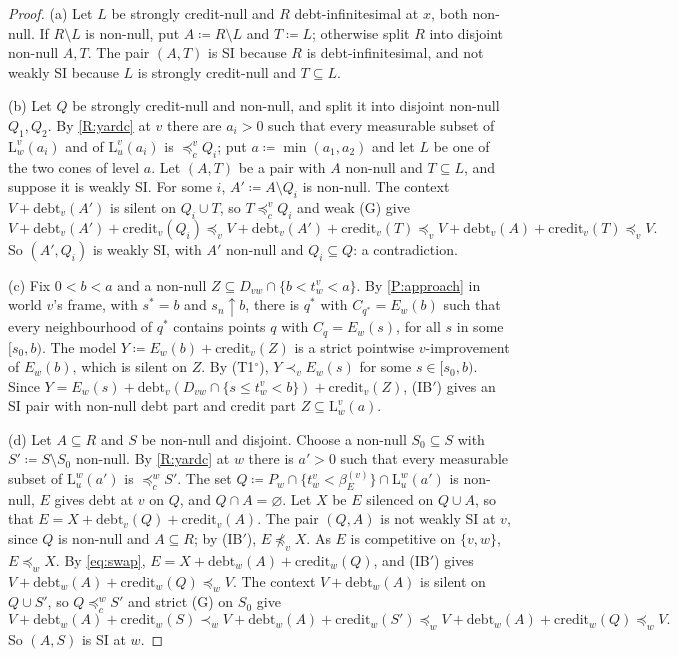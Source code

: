 \documentclass[11pt]{article}
\theoremstyle{definition}\newtheorem{definition}[theorem]{Definition}
\theoremstyle{remark}\newtheorem{remark}[theorem]{Remark}
\newcommand{\debt}{\mathrm{debt}}
\newcommand{\cred}{\mathrm{credit}}
\newcommand{\Lo}[3]{\mathrm L^{#1}_{#2}(#3)}
\newcommand{\To}{\textup{(T1$^\circ$)}}
\begin{document}
\begin{proof}
(a) Let $L$ be strongly credit-null and $R$ debt-infinitesimal at $x$, both
non-null. If $R\setminus L$ is non-null, put $A\coloneqq R\setminus L$ and
$T\coloneqq L$; otherwise split $R$ into disjoint non-null $A,T$. The pair
$(A,T)$ is SI because $R$ is debt-infinitesimal, and not weakly SI because
$L$ is strongly credit-null and $T\subseteq L$.

(b) Let $Q$ be strongly credit-null and non-null, and split it into
disjoint non-null $Q_1,Q_2$. By \ref{R:yardc} at $v$ there are $a_i>0$ such
that every measurable subset of $\Lo vw{a_i}$ and of $\Lo vu{a_i}$ is
$\preceq^v_cQ_i$; put $a\coloneqq\min(a_1,a_2)$ and let $L$ be one of the two
cones of level $a$. Let $(A,T)$ be a pair with $A$ non-null and $T\subseteq
L$, and suppose it is weakly SI. For some $i$, $A'\coloneqq A\setminus Q_i$
is non-null. The context $V+\debt_v(A')$ is silent on $Q_i\cup T$, so
$T\preceq^v_cQ_i$ and weak (G) give
\[
 V+\debt_v(A')+\cred_v(Q_i)\preceq_vV+\debt_v(A')+\cred_v(T)\preceq_v
 V+\debt_v(A)+\cred_v(T)\preceq_vV.
\]
So $(A',Q_i)$ is weakly SI, with $A'$ non-null and $Q_i\subseteq Q$: a
contradiction.

(c) Fix $0<b<a$ and a non-null $Z\subseteq D_{vw}\cap\{b<t^v_w<a\}$. By
\ref{P:approach} in world $v$'s frame, with $s^*=b$ and $s_n\uparrow b$,
there is $q^*$ with $C_{q^*}=E_w(b)$ such that every neighbourhood of $q^*$
contains points $q$ with $C_q=E_w(s)$, for all $s$ in some $[s_0,b)$. The
model $Y\coloneqq E_w(b)+\cred_v(Z)$ is a strict pointwise $v$-improvement of
$E_w(b)$, which is silent on $Z$. By \To{}, $Y\prec_vE_w(s)$ for some
$s\in[s_0,b)$. Since
$Y=E_w(s)+\debt_v(D_{vw}\cap\{s\le t^v_w<b\})+\cred_v(Z)$, (IB$'$) gives an
SI pair with non-null debt part and credit part $Z\subseteq\Lo vwa$.

(d) Let $A\subseteq R$ and $S$ be non-null and disjoint. Choose a non-null
$S_0\subseteq S$ with $S'\coloneqq S\setminus S_0$ non-null. By
\ref{R:yardc} at $w$ there is $a'>0$ such that every measurable subset of
$\Lo wu{a'}$ is $\preceq^w_cS'$. The set $Q\coloneqq P_w\cap
\{t^v_w<\beta^{(v)}_E\}\cap\Lo wu{a'}$ is non-null, $E$ gives debt at $v$ on
$Q$, and $Q\cap A=\varnothing$. Let $X$ be $E$ silenced on $Q\cup A$, so
that $E=X+\debt_v(Q)+\cred_v(A)$. The pair $(Q,A)$ is not weakly SI at $v$,
since $Q$ is non-null and $A\subseteq R$; by (IB$'$), $E\not\preceq_vX$. As
$E$ is competitive on $\{v,w\}$, $E\preceq_wX$. By \eqref{eq:swap},
$E=X+\debt_w(A)+\cred_w(Q)$, and (IB$'$) gives
$V+\debt_w(A)+\cred_w(Q)\preceq_wV$. The context $V+\debt_w(A)$ is silent on
$Q\cup S'$, so $Q\preceq^w_cS'$ and strict (G) on $S_0$ give
\[
 V+\debt_w(A)+\cred_w(S)\prec_wV+\debt_w(A)+\cred_w(S')\preceq_w
 V+\debt_w(A)+\cred_w(Q)\preceq_wV.
\]
So $(A,S)$ is SI at $w$.


\end{proof}
\end{document}
